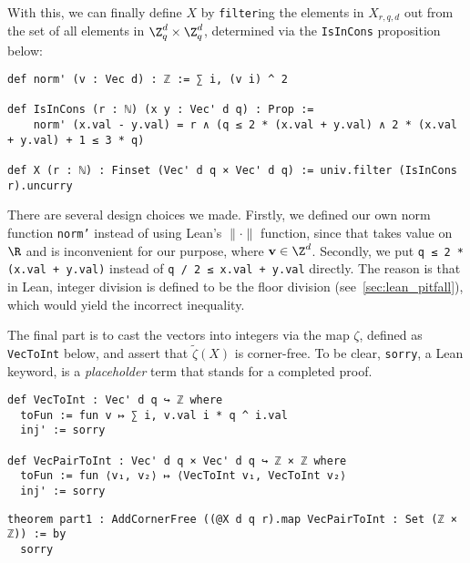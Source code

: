 With this, we can finally define \(X\) by \texttt{filter}ing the elements in \(X_{r, q, d}\) out from the set of all elements in \(\Z_q^d \times \Z_q^d\), determined via the \texttt{IsInCons} proposition below:

\begin{verbatim}
def norm' (v : Vec d) : ℤ := ∑ i, (v i) ^ 2

def IsInCons (r : ℕ) (x y : Vec' d q) : Prop :=
    norm' (x.val - y.val) = r ∧ (q ≤ 2 * (x.val + y.val) ∧ 2 * (x.val + y.val) + 1 ≤ 3 * q)

def X (r : ℕ) : Finset (Vec' d q × Vec' d q) := univ.filter (IsInCons r).uncurry
\end{verbatim}

There are several design choices we made. Firstly, we defined our own norm function \texttt{norm'} instead of using Lean's \(\| \cdot \|\) function, since that takes value on \(\R\) and is inconvenient for our purpose, where \(\mathbf{v} \in \Z^d\). \label{construction_div_two} Secondly, we put \texttt{q ≤ 2 * (x.val + y.val)} instead of \texttt{q / 2 ≤ x.val + y.val} directly. The reason is that in Lean, integer division is defined to be the floor division (see~\cref{sec:lean_pitfall}), which would yield the incorrect inequality.

The final part is to cast the vectors into integers via the map \(\zeta\), defined as \texttt{VecToInt} below, and assert that \(\widetilde{\zeta}(X)\) is corner-free. To be clear, \texttt{sorry}, a Lean keyword, is a \textit{placeholder} term that stands for a completed proof.

\begin{verbatim}
def VecToInt : Vec' d q ↪ ℤ where
  toFun := fun v ↦ ∑ i, v.val i * q ^ i.val
  inj' := sorry

def VecPairToInt : Vec' d q × Vec' d q ↪ ℤ × ℤ where
  toFun := fun ⟨v₁, v₂⟩ ↦ ⟨VecToInt v₁, VecToInt v₂⟩
  inj' := sorry
\end{verbatim}

\begin{verbatim}
theorem part1 : AddCornerFree ((@X d q r).map VecPairToInt : Set (ℤ × ℤ)) := by
  sorry
\end{verbatim}
